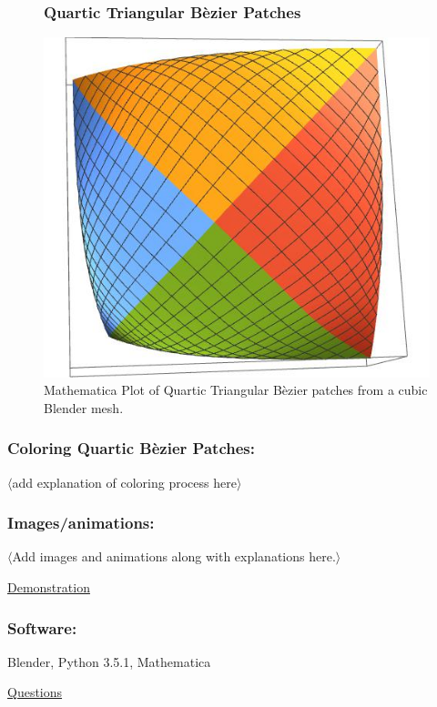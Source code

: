\documentclass[11pt]{beamer}
\begin{document}
	\begin{frame}
		\begin{figure}[h]
			\frametitle{Quartic Triangular B\`ezier Patches}
			\centering
			\includegraphics[width=.43\linewidth]{img/bezier_patch}
			\caption{Mathematica Plot of Quartic Triangular B\`ezier patches from  a cubic Blender mesh.}
		\end{figure}
	\end{frame}

	\begin{frame}
		\frametitle{Coloring Quartic B\`ezier Patches:}
		$\langle$add explanation of coloring process here$\rangle$
	\end{frame}

	\begin{frame}
		\frametitle{Images/animations:}
		$\langle$Add images and animations along with explanations here.$\rangle$
	\end{frame}

	
	\begin{frame}
		\centering
		\underline{{\huge Demonstration}}
	\end{frame}
	

	\begin{frame} 
		\frametitle{Software:}
		Blender, Python 3.5.1, Mathematica
	\end{frame}

	\begin{frame}
		\centering
		\underline{{\huge Questions}}
	\end{frame}
	
\end{document}
